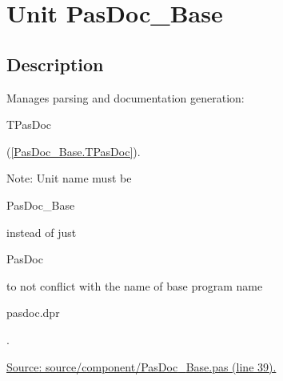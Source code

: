 \documentclass{report}
\begin{document}
\chapter{Unit PasDoc{\_}Base}
\label{PasDoc_Base}
\section{Description}
Manages parsing and documentation generation: \begin{ttfamily}TPasDoc\end{ttfamily}(\ref{PasDoc_Base.TPasDoc}).\hfill\vspace*{1ex}



        

Note: Unit name must be \begin{ttfamily}PasDoc{\_}Base\end{ttfamily} instead of just \begin{ttfamily}PasDoc\end{ttfamily} to not conflict with the name of base program name \begin{ttfamily}pasdoc.dpr\end{ttfamily}.\par
\href{https://github.com/pasdoc/pasdoc/blob/master/source/component/PasDoc_Base.pas#L39}{Source: source/component/PasDoc{\_}Base.pas (line 39).}
\end{document}
